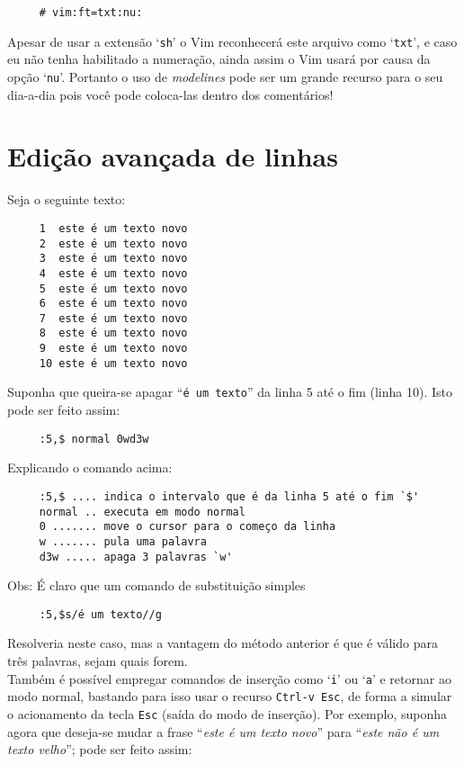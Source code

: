 \begin{verbatim}
     # vim:ft=txt:nu:
\end{verbatim}

Apesar de usar a extensão `{\tt sh}' o Vim reconhecerá este arquivo como `{\tt txt}', e
caso eu não tenha habilitado a numeração, ainda assim o Vim usará por causa da
opção `{\tt nu}'.  Portanto o uso de {\em modelines} pode ser um grande recurso para o seu
dia-a-dia pois você pode coloca-las dentro dos comentários!

\section{Edição avançada de linhas}

Seja o seguinte texto:

\begin{verbatim}
     1  este é um texto novo
     2  este é um texto novo
     3  este é um texto novo
     4  este é um texto novo
     5  este é um texto novo
     6  este é um texto novo
     7  este é um texto novo
     8  este é um texto novo
     9  este é um texto novo
     10 este é um texto novo
\end{verbatim}

Suponha que queira-se apagar ``{\tt é um texto}'' da linha 5 até o fim (linha
10). Isto pode ser feito assim:

\begin{verbatim}
     :5,$ normal 0wd3w
\end{verbatim}

Explicando o comando acima:

\begin{verbatim}
     :5,$ .... indica o intervalo que é da linha 5 até o fim `$'
     normal .. executa em modo normal
     0 ....... move o cursor para o começo da linha
     w ....... pula uma palavra
     d3w ..... apaga 3 palavras `w'
\end{verbatim}

Obs: É claro que um comando de substituição simples

\begin{verbatim}
     :5,$s/é um texto//g
\end{verbatim}

Resolveria neste caso, mas a vantagem do método anterior é que
é válido para três palavras, sejam quais forem.\\

Também é possível empregar comandos de inserção como `{\tt i}' ou `{\tt a}' e
retornar ao modo normal, bastando para isso usar o recurso \verb|Ctrl-v Esc|,
de forma a simular o acionamento da tecla \verb|Esc| (saída do modo de
inserção). Por exemplo, suponha agora que deseja-se mudar a frase ``{\em este
é um texto novo}'' para ``{\em este não é um texto velho}''; pode ser feito
assim:


